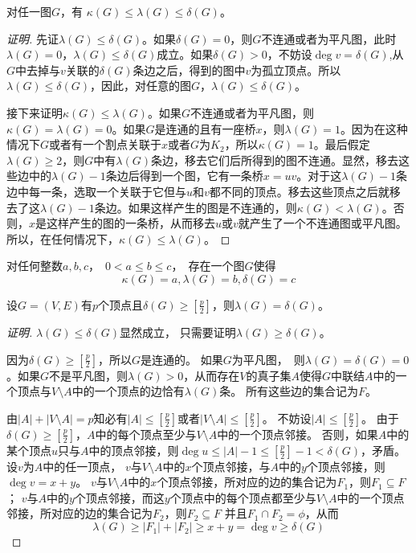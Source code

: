   \begin{Thm}
    对任一图$G$，有 $\kappa (G) \leq \lambda (G) \leq \delta (G)$。
  \end{Thm}
  \begin{proof}[证明]
    先证$\lambda (G) \leq \delta (G)$。如果$\delta(G) = 0$，则$G$不连通或者为平凡图，此时$\lambda(G) = 0$，$\lambda(G)\leq \delta(G)$成立。如果$\delta(G)>0$，不妨设$\deg v = \delta(G)$,从$G$中去掉与$v$关联的$\delta(G)$条边之后，得到的图中$v$为孤立顶点。所以$\lambda(G) \leq \delta(G)$，因此，对任意的图$G$，$\lambda(G)\leq \delta(G)$。

    接下来证明$\kappa (G) \leq \lambda (G)$。如果$G$不连通或者为平凡图，则$\kappa(G)=\lambda(G)=0$。如果$G$是连通的且有一座桥$x$，则$\lambda(G)=1$。因为在这种情况下$G$或者有一个割点关联于$x$或者$G$为$K_2$，所以$\kappa(G)=1$。最后假定$\lambda(G)\geq 2$，则$G$中有$\lambda(G)$条边，移去它们后所得到的图不连通。显然，移去这些边中的$\lambda(G)-1$条边后得到一个图，它有一条桥$x=uv$。对于这$\lambda(G)-1$条边中每一条，选取一个关联于它但与$u$和$v$都不同的顶点。移去这些顶点之后就移去了这$\lambda(G)-1$条边。如果这样产生的图是不连通的，则$\kappa(G) < \lambda(G)$。否则，$x$是这样产生的图的一条桥，从而移去$u$或$v$就产生了一个不连通图或平凡图。所以，在任何情况下，$\kappa(G) \leq \lambda(G)$。
  \end{proof}

    \begin{Thm}
    对任何整数$a,b,c$，　$0 < a \leq b \leq c$，　存在一个图$G$使得\[\kappa (G)
      = a, \lambda (G) = b, \delta (G) = c\]
  \end{Thm}

    \begin{Thm}
    设$G=(V,E)$有$p$个顶点且$\delta(G) \geq [ \frac{p}{2} ]$，则$\lambda(G) = \delta(G)$。
  \end{Thm}
  \begin{proof}[证明]
     $\lambda(G) \leq \delta(G)$显然成立， 只需要证明$\lambda(G) \geq \delta(G)$。

     

    因为$\delta(G) \geq [\frac{p}{2}]$，所以$G$是连通的。 如果$G$为平凡图，　则$\lambda (G) = \delta(G) = 0$。如果$G$不是平凡图，则$\lambda(G) > 0$，从而存在$V$的真子集$A$使得$G$中联结$A$中的一个顶点与$V\setminus A$中的一个顶点的边恰有$\lambda(G)$条。 所有这些边的集合记为$F$。

   由$|A| + |V\setminus A| = p$知必有$|A| \leq [\frac{p}{2}]$或者$|V\setminus A| \leq [\frac{p}{2}]$。 不妨设$|A| \leq [\frac{p}{2}]$。  由于$\delta(G) \geq [\frac{p}{2}]$，$A$中的每个顶点至少与$V\setminus A$中的一个顶点邻接。 否则，如果$A$中的某个顶点$u$只与$A$中的顶点邻接，则$\deg u \leq |A|-1 \leq [\frac{p}{2}] - 1 < \delta(G)$，矛盾。 
    设$v$为$A$中的任一顶点， $v$与$V\setminus A$中的$x$个顶点邻接，与$A$中的$y$个顶点邻接，则$\deg v = x + y$。  $v$与$V\setminus A$中的$x$个顶点邻接，所对应的边的集合记为$F_1$，则$F_1 \subseteq F$；
    $v$与$A$中的$y$个顶点邻接，而这$y$个顶点中的每个顶点都至少与$V\setminus A$中的一个顶点邻接，所对应的边的集合记为$F_2$，则$F_2 \subseteq F$ 并且$F_1 \cap F_2 = \phi$，从而
    \[\lambda(G) \geq |F_1| + |F_2| \geq x + y = \deg v \geq  \delta(G)\]
  \end{proof}

